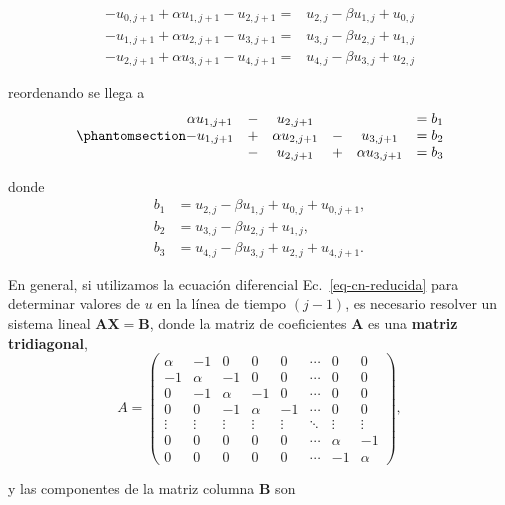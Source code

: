 \documentclass[
  spanish,
  us-letterpaper,
]{scrreprt}
\theoremstyle{definition}
\theoremstyle{plain}
\theoremstyle{remark}
\begin{document}
\[
\begin{split}
-u_{0,j+1} + \alpha u_{1,j+1} - u_{2,j+1} =& u_{2,j} - \beta u_{1,j} + u_{0,j} \\
-u_{1,j+1} + \alpha u_{2,j+1} - u_{3,j+1} =& u_{3,j} - \beta u_{2,j} + u_{1,j} \\
-u_{2,j+1} + \alpha u_{3,j+1} - u_{4,j+1} =& u_{4,j} - \beta u_{3,j} + u_{2,j}
\end{split}
\]

reordenando se llega a
\begin{equation}\phantomsection\label{eq-cn-matrix}{
\begin{matrix}
\alpha u_{1,j+1} &-& u_{2,j+1}&& &= b_1 \\
-u_{1,j+1} &+& \alpha u_{2,j+1} &-& u_{3,j+1} &= b_2 \\
&-&u_{2,j+1} &+& \alpha u_{3,j+1} &= b_3
\end{matrix}
}\end{equation}

donde \begin{align*}
b_1 &= u_{2,j} - \beta u_{1,j} + u_{0,j} + u_{0,j+1}, \\
b_2 &= u_{3,j} - \beta u_{2,j} + u_{1,j}, \\
b_3 &= u_{4,j} - \beta u_{3,j} + u_{2,j} + u_{4,j+1}.
\end{align*}

En general, si utilizamos la ecuación diferencial
Ec.~\ref{eq-cn-reducida} para determinar valores de \(u\) en la línea de
tiempo \((j -1)\), es necesario resolver un sistema lineal
\(\mathbf{AX=B}\), donde la matriz de coeficientes \(\mathbf{A}\) es una
\textbf{matriz tridiagonal}, \[
A = 
\begin{pmatrix}
\alpha & -1    & 0      & 0      & 0      & \cdots & 0 & 0      \\
-1     & \alpha & -1     & 0      & 0      & \cdots & 0 & 0      \\
0      & -1     & \alpha & -1     & 0      & \cdots & 0 & 0      \\
0      & 0      & -1     & \alpha & -1     & \cdots & 0 & 0      \\
\vdots & \vdots & \vdots & \vdots & \vdots & \ddots & \vdots & \vdots \\
0      & 0      & 0      & 0      & 0      & \cdots & \alpha & -1 \\
0      & 0      & 0      & 0      & 0      & \cdots & -1     & \alpha
\end{pmatrix},
\]

y las componentes de la matriz columna \(\mathbf{B}\) son
\end{document}
